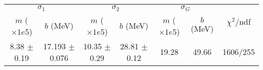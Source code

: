 \begin{tabular}{cc|cc|cc||c}
\multicolumn{2}{c|}{$\sigma_1$} & \multicolumn{2}{|c}{$\sigma_2$} & \multicolumn{2}{|c}{$\sigma_G$}  & \multirow{2}{*}{$\chi^2/$ndf}\\
$m$ ($\times1e5$) & $b$ (MeV) & $m$ ($\times1e5$) & $b$ (MeV) & $m$ ($\times1e5$) & $b$ (MeV) & \\
\hline
8.38 $\pm$ 0.19 & 17.193 $\pm$ 0.076 & 10.35 $\pm$ 0.29 & 28.81 $\pm$ 0.12 & 19.28 & 49.66 & 1606/255\\
\end{tabular}
